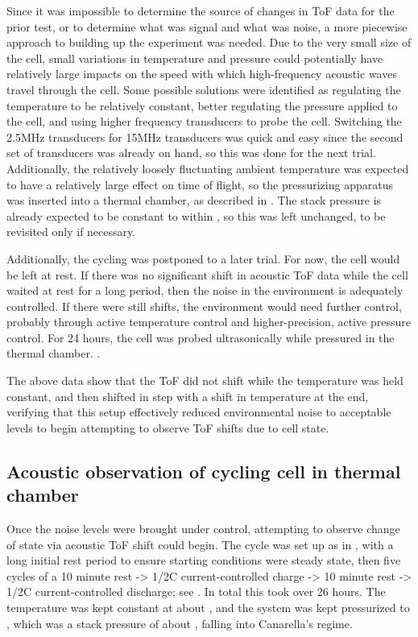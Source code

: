 Since it was impossible to determine the source of changes in ToF data for the prior test, or to determine what was signal and what was noise, a more piecewise approach to building up the experiment was needed. Due to the very small size of the cell, small variations in temperature and pressure could potentially have relatively large impacts on the speed with which high-frequency acoustic waves travel through the cell. Some possible solutions were identified as regulating the temperature to be relatively constant, better regulating the pressure applied to the cell, and using higher frequency transducers to probe the cell. Switching the 2.5MHz transducers for 15MHz transducers was quick and easy since the second set of transducers was already on hand, so this was done for the next trial. Additionally, the relatively loosely fluctuating ambient temperature was expected to have a relatively large effect on time of flight, so the pressurizing apparatus was inserted into a thermal chamber, as described in . The stack pressure is already expected to be constant to within , so this was left unchanged, to be revisited only if necessary.

Additionally, the cycling was postponed to a later trial. For now, the cell would be left at rest. If there was no significant shift in acoustic ToF data while the cell waited at rest for a long period, then the noise in the environment is adequately controlled. If there were still shifts, the environment would need further control, probably through active temperature control and higher-precision, active pressure control. For 24 hours, the cell was probed ultrasonically while pressured in the thermal chamber. .

The above data show that the ToF did not shift while the temperature was held constant, and then shifted in step with a shift in temperature at the end, verifying that this setup effectively reduced environmental noise to acceptable levels to begin attempting to observe ToF shifts due to cell state.

    
\subsection{Acoustic observation of cycling cell in thermal chamber}
Once the noise levels were brought under control, attempting to observe change of state via acoustic ToF shift could begin. The cycle was set up as in , with a long initial rest period to ensure starting conditions were steady state, then five cycles of a 10 minute rest -> 1/2C current-controlled charge -> 10 minute rest -> 1/2C current-controlled discharge; see . In total this took over 26 hours. The temperature was kept constant at about , and the system was kept pressurized to , which was a stack pressure of about , falling into Canarella's  regime.

